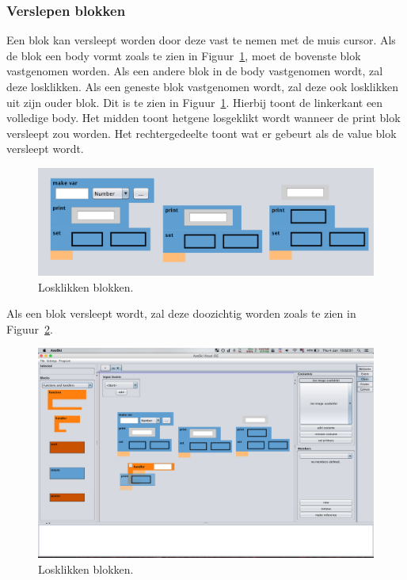 \documentclass[]{article}
\begin{document}
\subsubsection{Verslepen blokken}
Een blok kan versleept worden door deze vast te nemen met de muis cursor. Als de blok een body vormt zoals te zien in Figuur~\ref{bodydoc}, moet de bovenste blok vastgenomen worden. Als een andere blok in de body vastgenomen wordt, zal deze losklikken. Als een geneste blok vastgenomen wordt, zal deze ook losklikken uit zijn ouder blok. Dit is te zien in Figuur~\ref{bodydoc}. Hierbij toont de linkerkant een volledige body. Het midden toont hetgene losgeklikt wordt wanneer de print blok versleept zou worden. Het rechtergedeelte toont wat er gebeurt als de value blok versleept wordt.
\begin{figure}[H]
  \centering
\includegraphics[scale=0.5]{Documentatie/images/losklikken}
  \caption{Losklikken blokken.} \label{bodydoc}
\end{figure}

Als een blok versleept wordt, zal deze doozichtig worden zoals te zien in Figuur~\ref{transparant}.
\begin{figure}[H]
  \centering
\includegraphics[scale=0.3]{Documentatie/images/transparent}
  \caption{Losklikken blokken.} \label{transparant}
\end{figure}
\end{document}
